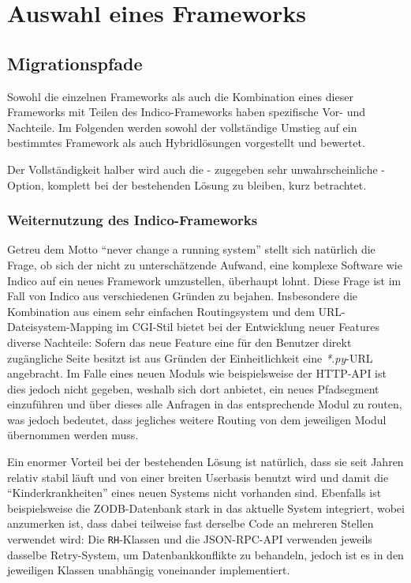 \chapter{Auswahl eines Frameworks}

\section{Migrationspfade}
Sowohl die einzelnen Frameworks als auch die Kombination eines dieser Frameworks mit Teilen des
Indico-Frameworks haben spezifische Vor- und Nachteile. Im Folgenden werden sowohl der vollständige
Umstieg auf ein bestimmtes Framework als auch Hybridlösungen vorgestellt und bewertet.

Der Vollständigkeit halber wird auch die - zugegeben sehr unwahrscheinliche - Option, komplett bei
der bestehenden Lösung zu bleiben, kurz betrachtet.

\subsection{Weiternutzung des Indico-Frameworks}
Getreu dem Motto \enquote{never change a running system} stellt sich natürlich die Frage, ob sich
der nicht zu unterschätzende Aufwand, eine komplexe Software wie Indico auf ein neues Framework
umzustellen, überhaupt lohnt. Diese Frage ist im Fall von Indico aus verschiedenen Gründen zu
bejahen. Insbesondere die Kombination aus einem sehr einfachen Routingsystem und dem
URL-Dateisystem-Mapping im CGI-Stil bietet bei der Entwicklung neuer Features diverse Nachteile:
Sofern das neue Feature eine für den Benutzer direkt zugängliche Seite besitzt ist aus Gründen der
Einheitlichkeit eine \emph{*.py}-URL angebracht. Im Falle eines neuen Moduls wie beispielsweise der
HTTP-API ist dies jedoch nicht gegeben, weshalb sich dort anbietet, ein neues Pfadsegment
einzuführen und über dieses alle Anfragen in das entsprechende Modul zu routen, was jedoch bedeutet,
dass jegliches weitere Routing von dem jeweiligen Modul übernommen werden muss.

Ein enormer Vorteil bei der bestehenden Lösung ist natürlich, dass sie seit Jahren relativ stabil
läuft und von einer breiten Userbasis benutzt wird und damit die \enquote{Kinderkrankheiten} eines
neuen Systems nicht vorhanden sind. Ebenfalls ist beispielsweise die ZODB-Datenbank stark in das
aktuelle System integriert, wobei anzumerken ist, dass dabei teilweise fast derselbe Code an
mehreren Stellen verwendet wird: Die \lstinline{RH}-Klassen und die JSON-RPC-API verwenden jeweils
dasselbe Retry-System, um Datenbankkonflikte zu behandeln, jedoch ist es in den jeweiligen Klassen
unabhängig voneinander implementiert.

